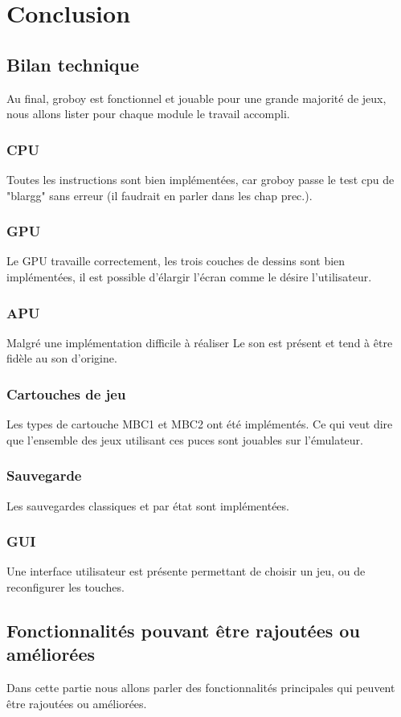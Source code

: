 \documentclass{report}
\begin{document}
\chapter*{Conclusion}
\section*{Bilan technique}
Au final, groboy est fonctionnel et jouable pour une grande majorité de jeux, nous allons lister pour chaque module le travail accompli. 
\subsection*{CPU}
Toutes les instructions sont bien implémentées, car groboy passe le test cpu de "blargg" sans erreur (il faudrait en parler dans les chap prec.). 
\subsection*{GPU}
Le GPU travaille correctement, les trois couches de dessins sont bien implémentées, il est possible d'élargir l'écran comme le désire l'utilisateur.
\subsection*{APU}
Malgré une implémentation difficile à réaliser Le son est présent et tend à être fidèle au son d'origine.
\subsection*{Cartouches de jeu}
Les types de cartouche MBC1 et MBC2 ont été implémentés. Ce qui veut dire que l'ensemble des jeux utilisant ces puces sont jouables sur l'émulateur.
\subsection*{Sauvegarde}
Les sauvegardes classiques et par état sont implémentées.
\subsection*{GUI}
Une interface utilisateur est présente permettant de choisir un jeu, ou de reconfigurer les touches.
\section*{Fonctionnalités pouvant être rajoutées ou améliorées}
Dans cette partie nous allons parler des fonctionnalités principales qui peuvent être rajoutées ou améliorées.
\end{document}
